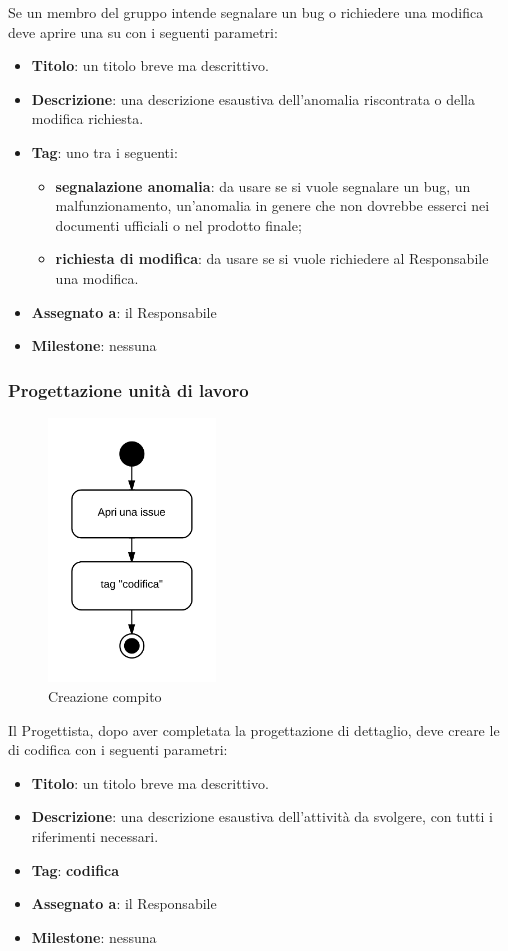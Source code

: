 Se un membro del gruppo intende segnalare un bug o richiedere una modifica deve aprire una  su  con i seguenti parametri:
\begin{itemize}
 \item \textbf{Titolo}: un titolo breve ma descrittivo.
 \item \textbf{Descrizione}: una descrizione esaustiva dell'anomalia riscontrata o della modifica richiesta.
 \item \textbf{Tag}: uno tra i seguenti:
  \begin{itemize}
   \item \textbf{segnalazione anomalia}: da usare se si vuole segnalare un bug, un malfunzionamento, un'anomalia in genere che non dovrebbe esserci nei documenti ufficiali o nel prodotto finale;
   \item \textbf{richiesta di modifica}: da usare se si vuole richiedere al Responsabile una modifica.
  \end{itemize}
 \item \textbf{Assegnato a}: il Responsabile
 \item \textbf{Milestone}: nessuna
\end{itemize}

\subsubsection{Progettazione unità di lavoro}

\begin{figure}[H]
    \centering
    \includegraphics[height=7cm]{uml-processi/progettazione_unita_di_lavoro.png}
    \caption{Creazione compito}
\end{figure}

Il Progettista, dopo aver completata la progettazione di dettaglio, deve creare le  di codifica con i seguenti parametri:
\begin{itemize}
 \item \textbf{Titolo}: un titolo breve ma descrittivo.
 \item \textbf{Descrizione}: una descrizione esaustiva dell'attività da svolgere, con tutti i riferimenti necessari.
 \item \textbf{Tag}: \textbf{codifica}
 \item \textbf{Assegnato a}: il Responsabile
 \item \textbf{Milestone}: nessuna
\end{itemize}

